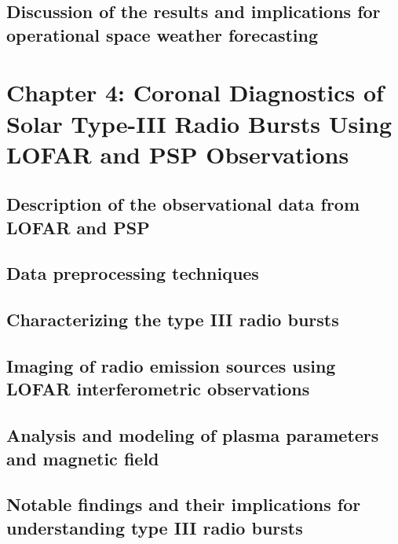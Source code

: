 \documentclass{article}
\begin{document}
\subsection{Discussion of the results and implications for operational space weather forecasting}

\section{Chapter 4: Coronal Diagnostics of Solar Type-III Radio Bursts Using LOFAR and PSP Observations}
%


\subsection{Description of the observational data from LOFAR and PSP}
\subsection{Data preprocessing techniques}
\subsection{Characterizing the type III radio bursts}
\subsection{Imaging of radio emission sources using LOFAR interferometric observations}
\subsection{Analysis and modeling of plasma parameters and magnetic field}
\subsection{Notable findings and their implications for understanding type III radio bursts}

\end{document}
